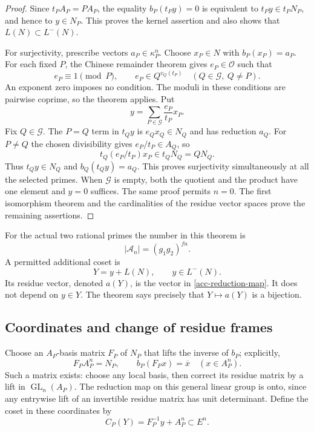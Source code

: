 \begin{proof}
Since $t_PA_P=PA_P$, the equality $b_P(t_Py)=0$ is equivalent to
$t_Py\in t_PN_P$, and hence to $y\in N_P$.
This proves the kernel assertion and also shows that
$L(N)\subset L^-(N)$.

For surjectivity, prescribe vectors $a_P\in\kappa_P^n$.
Choose $x_P\in N$ with $b_P(x_P)=a_P$.
For each fixed $P$, the Chinese remainder theorem gives
$e_P\in\mathcal O$ such that
\[
 e_P\equiv1\pmod P,\qquad
 e_P\in Q^{v_Q(t_P)}\quad
       (Q\in\mathcal G,\ Q\ne P).
\]
An exponent zero imposes no condition.  The moduli in these
conditions are pairwise coprime, so the theorem applies.
Put
\[
                         y=\sum_{P\in\mathcal G}
                                      \frac{e_P}{t_P}x_P.
\]
Fix $Q\in\mathcal G$.  The $P=Q$ term in $t_Qy$ is
$e_Qx_Q\in N_Q$ and has reduction $a_Q$.
For $P\ne Q$ the chosen divisibility gives
$e_P/t_P\in A_Q$, so
\[
             t_Q(e_P/t_P)x_P\in t_QN_Q=QN_Q.
\]
Thus $t_Qy\in N_Q$ and $b_Q(t_Qy)=a_Q$.
This proves surjectivity simultaneously at all the selected primes.
When $\mathcal G$ is empty, both the quotient and the product have
one element and $y=0$ suffices.  The same proof permits $n=0$.
The first isomorphism theorem and the cardinalities of the residue
vector spaces prove the remaining assertions.
\end{proof}

For the actual two rational primes the number in this theorem is
\begin{equation}\label{acc-number-cosets}
                         |\mathcal A_n|=(g_1g_2)^{fn}.
\end{equation}
A permitted additional coset is
\[
                          Y=y+L(N),\qquad y\in L^-(N).
\]
Its residue vector, denoted $a(Y)$, is the vector in
\eqref{acc-reduction-map}.  It does not depend on $y\in Y$.
The theorem says precisely that $Y\mapsto a(Y)$ is a bijection.

\subsection{Coordinates and change of residue frames}

Choose an $A_P$-basis matrix $F_P$ of $N_P$ that lifts the
inverse of $b_P$; explicitly,
\[
 F_P A_P^n=N_P,
 \qquad b_P(F_Px)=\overline x\quad(x\in A_P^n).
\]
Such a matrix exists: choose any local basis, then correct its
residue matrix by a lift in $\operatorname{GL}_n(A_P)$.
The reduction map on this general linear group is onto, since
any entrywise lift of an invertible residue matrix has unit determinant.
Define the coset in these coordinates by
\begin{equation}\label{acc-coordinate-coset}
                    C_P(Y)=F_P^{-1}y+A_P^n\subset E^n.
\end{equation}

